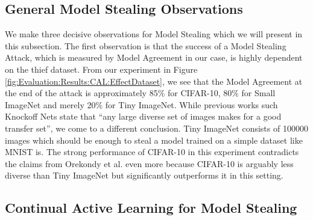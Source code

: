 \subsection{General Model Stealing Observations}
\label{sec:Discussion:ModelStealing:General}
We make three decisive observations for Model Stealing which we will present in this subsection. The first observation is that the success of a Model Stealing Attack, which is measured by Model Agreement in our case, is highly dependent on the thief dataset. From our experiment in 
Figure \ref{fig:Evaluation:Results:CAL:EffectDataset}, we see that the Model Agreement at the end of the attack is approximately 85\% for CIFAR-10, 80\% for Small ImageNet and merely 20\% for Tiny ImageNet. While previous works such Knockoff Nets state that \enquote{any large diverse set
of images makes for a good transfer set}, we come to a different conclusion. Tiny ImageNet consists of 100000 images which should be enough to steal a model trained on a simple dataset like MNIST is. The strong performance of CIFAR-10 in this experiment contradicts the claims from
Orekondy et al. even more because CIFAR-10 is arguably less diverse than Tiny ImageNet but significantly outperforms it in this setting. \par


\subsection{Continual Active Learning for Model Stealing}
\label{sec:Discussion:ModelStealing:CALMS}


